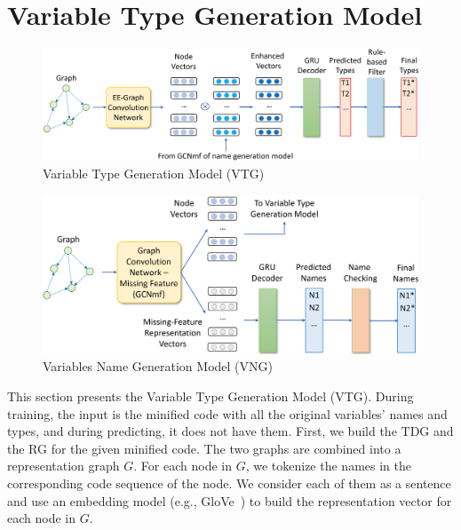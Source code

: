 \section{Variable Type Generation Model}
\label{sec:type-gen}

\begin{figure}[ht]
	\begin{center}
	  \includegraphics[width=4.8in]{figures/type-gen-model}
          \vspace{-10pt}
		\caption{Variable Type Generation Model (VTG)}
		\label{fig:type-gen}
	\end{center}
\end{figure}

\begin{figure}[h]
	\begin{center}
	  \includegraphics[width=4.6in]{figures/name-gen-model}
          \vspace{-10pt}
		\caption{Variables Name Generation Model (VNG)}
		\label{fig:name-gen}
	\end{center}
\end{figure}

This section presents the Variable Type Generation Model (VTG). During
training, the input is the minified code with all the original
variables’ names and types, and during predicting, it does not have
them. First, we build the TDG and the RG for the given minified code.
The two graphs are combined into a representation graph $G$. For each
node in $G$, we tokenize the names in the corresponding code sequence
of the node. We consider each of them as a sentence and use an
embedding model (e.g., GloVe~\cite{pennington2014glove}) to build the
representation vector for each node in $G$.

